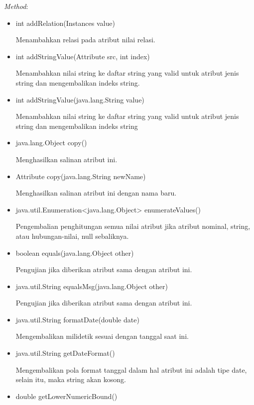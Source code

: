\textsl{Method}:
\begin{itemize}
	\item int addRelation(Instances value)
	
	Menambahkan relasi pada atribut nilai relasi.
	
	\item int addStringValue(Attribute src, int index)
	
	Menambahkan nilai string ke daftar string yang valid untuk atribut jenis string dan mengembalikan indeks string.
	
	\item int addStringValue(java.lang.String value)
	
	Menambahkan nilai string ke daftar string yang valid untuk atribut jenis string dan mengembalikan indeks string
	
	\item java.lang.Object copy()
	
	Menghasilkan salinan atribut ini.
	
	\item Attribute copy(java.lang.String newName)
	
	Menghasilkan salinan atribut ini dengan nama baru.
	
	\item java.util.Enumeration<java.lang.Object> enumerateValues()
	
	Pengembalian penghitungan semua nilai atribut jika atribut nominal, string, atau hubungan-nilai, null sebaliknya.
	
	\item boolean equals(java.lang.Object other)
	
	Pengujian jika diberikan atribut sama dengan atribut ini.
	
	\item java.util.String equalsMsg(java.lang.Object other)
	
	Pengujian jika diberikan atribut sama dengan atribut ini.
	
	\item java.util.String formatDate(double date)
	
	Mengembalikan milidetik sesuai dengan tanggal saat ini.
	
	\item java.util.String getDateFormat()
	
	Mengembalikan pola format tanggal dalam hal atribut ini adalah tipe date, selain itu, maka string akan kosong.
	
	\item double getLowerNumericBound()
	

\end{itemize}
